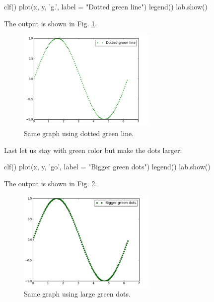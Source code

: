 \begin{bluecode}
clf()
plot(x, y, 'g.', label = "Dotted green line")
legend()
lab.show()
\end{bluecode}
The output is shown in Fig. \ref{fig:plot4}.

\begin{figure}[!ht]
\begin{center}
\includegraphics[width=0.6\textwidth]{imgp/plot4.png}
\end{center}
\vspace{-6mm}
\caption{Same graph using dotted green line.}
\label{fig:plot4}
\end{figure}
\noindent
\noindent
Last let us stay with green color but make the dots larger:

\begin{bluecode}
clf()
plot(x, y, 'go', label = "Bigger green dots")
legend()
lab.show()
\end{bluecode}
\noindent
The output is shown in Fig. \ref{fig:plot5}.
\newpage

\begin{figure}[!ht]
\begin{center}
\includegraphics[width=0.6\textwidth]{imgp/plot5.png}
\end{center}
\vspace{-6mm}
\caption{Same graph using large green dots.}
\label{fig:plot5}
\end{figure}
\noindent

